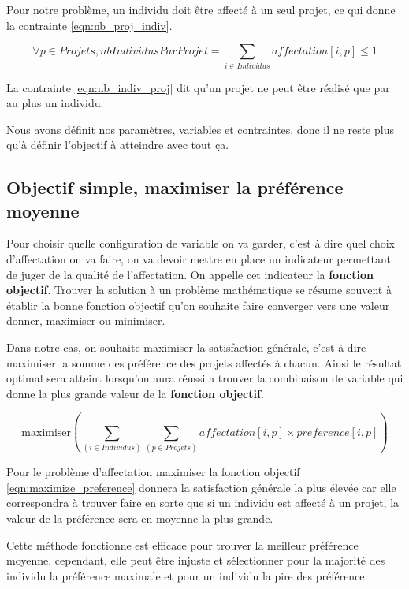 \documentclass{polytech/polytech}
\begin{document}
Pour notre problème, un individu doit être affecté à un seul projet, ce qui donne la contrainte \eqref{eqn:nb_proj_indiv}. 

\begin{equation}
\label{eqn:nb_indiv_proj}
\forall p \in Projets, nbIndividusParProjet= \sum_{i \in Individus} affectation[i,p] \leqslant 1
\end{equation}

La contrainte \eqref{eqn:nb_indiv_proj} dit qu'un projet ne peut être réalisé que par au plus un individu.

Nous avons définit nos paramètres, variables et contraintes, donc il ne reste plus qu'à définir l'objectif à atteindre avec tout ça. 
\subsection{Objectif simple, maximiser la préférence moyenne}
\label{sec:max_pref_moy}

Pour choisir quelle configuration de variable on va garder, c'est à dire quel choix d'affectation on va faire, on va devoir mettre en place un indicateur permettant de juger de la qualité de l'affectation. 
On appelle cet indicateur la \textbf{fonction objectif}.
Trouver la solution à un problème mathématique se résume souvent à établir la bonne fonction objectif qu'on souhaite faire converger vers une valeur donner, maximiser ou minimiser.


Dans notre cas, on souhaite maximiser la satisfaction générale, c'est à dire maximiser la somme des préférence des projets affectés à chacun. Ainsi le résultat optimal sera atteint lorsqu'on aura réussi a trouver la combinaison de variable qui donne la plus grande valeur de la \textbf{fonction objectif}. 

\begin{equation}
\label{eqn:maximize_preference}
\text{maximiser} \left( \sum_{(i \in Individus)} \sum_{(p\in Projets)} affectation[i,p]\times preference[i,p] \right)
\end{equation}

Pour le problème d'affectation maximiser la fonction objectif \eqref{eqn:maximize_preference} donnera la satisfaction générale la plus élevée car elle correspondra à trouver faire en sorte que si un individu est affecté à un projet, la valeur de la préférence sera en moyenne la plus grande.

Cette méthode fonctionne est efficace pour trouver la meilleur préférence moyenne, cependant, elle peut être injuste et sélectionner pour la majorité des individu la préférence maximale et pour un individu la pire des préférence.
\end{document}
